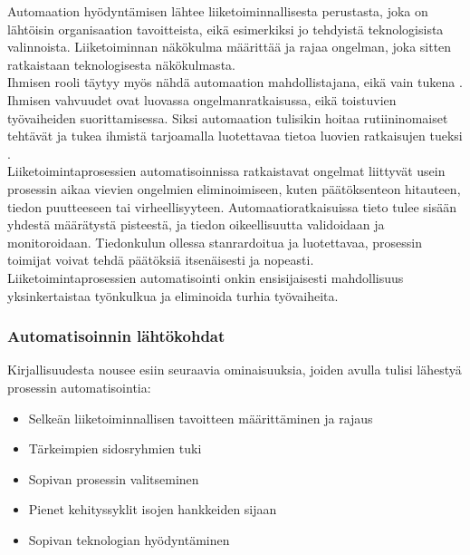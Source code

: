 \documentclass[finnish,12pt,a4paper,pdftex]{article}
\begin{document}
Automaation hyödyntämisen lähtee liiketoiminnallisesta perustasta, joka on lähtöisin organisaation tavoitteista, eikä esimerkiksi jo tehdyistä teknologisista valinnoista. Liiketoiminnan näkökulma määrittää ja rajaa ongelman, joka sitten ratkaistaan teknologisesta näkökulmasta. \citep{mohapatra}\\

Ihmisen rooli täytyy myös nähdä automaation mahdollistajana, eikä vain tukena \citep{mohapatra}. Ihmisen vahvuudet ovat luovassa ongelmanratkaisussa, eikä toistuvien työvaiheiden suorittamisessa. Siksi automaation tulisikin hoitaa rutiininomaiset tehtävät ja tukea ihmistä tarjoamalla luotettavaa tietoa luovien ratkaisujen tueksi \citep{leanit}.\\

Liiketoimintaprosessien automatisoinnissa ratkaistavat ongelmat liittyvät usein prosessin aikaa vievien ongelmien eliminoimiseen, kuten päätöksenteon hitauteen, tiedon puutteeseen tai virheellisyyteen. Automaatioratkaisuissa tieto tulee sisään yhdestä määrätystä pisteestä, ja tiedon oikeellisuutta validoidaan ja monitoroidaan. Tiedonkulun ollessa stanrardoitua ja luotettavaa, prosessin toimijat voivat tehdä päätöksiä itsenäisesti ja nopeasti. \citep{mohapatra}\\

Liiketoimintaprosessien automatisointi onkin ensisijaisesti mahdollisuus yksinkertaistaa työnkulkua ja eliminoida turhia työvaiheita. \citep{mohapatra}\\

\subsubsection{Automatisoinnin lähtökohdat}
 
Kirjallisuudesta nousee esiin seuraavia ominaisuuksia, joiden avulla tulisi lähestyä prosessin automatisointia:

\begin{itemize}
\setlength{\itemsep}{0pt}
    \item Selkeän liiketoiminnallisen tavoitteen määrittäminen ja rajaus
    \item Tärkeimpien sidosryhmien tuki
    \item Sopivan prosessin valitseminen
    \item Pienet kehityssyklit isojen hankkeiden sijaan
    \item Sopivan teknologian hyödyntäminen
\end{itemize}
\end{document}
